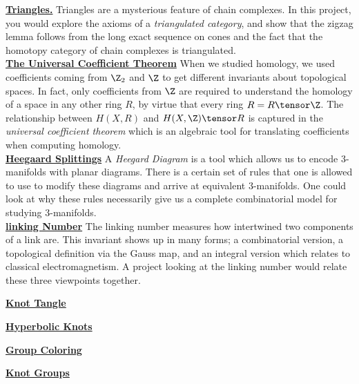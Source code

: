 \noindent \textbf{\hyperref[proj:derived] {Triangles.} } Triangles are a mysterious feature of chain complexes. In this project, you would explore the axioms of a \emph{triangulated category}, and show that the zigzag lemma follows from the long exact sequence on cones and the fact that the homotopy category of chain complexes is triangulated. \\


\noindent \textbf{\hyperref[proj:uct] {The Universal Coefficient Theorem} } When we studied homology, we used coefficients coming from $\Z_2$ and $\Z$ to get different invariants about topological spaces. In fact, only coefficients from $\Z$ are required to understand the homology of a space in any other ring $R$, by virtue that every ring $R=R\tensor \Z$. The relationship between $H(X, R)$ and $H(X, \Z)\tensor R$ is captured in the \emph{universal coefficient theorem} which is an algebraic tool for translating coefficients when computing homology.\\

\noindent \textbf{\hyperref[proj:heegaard]{Heegaard Splittings}} A \emph{Heegard Diagram} is a tool which allows us to encode 3-manifolds with planar diagrams. There is a certain set of rules that one is allowed to use to modify these diagrams and arrive at equivalent 3-manifolds. One could look at why these rules necessarily give us a complete combinatorial model for studying 3-manifolds. \\


\noindent \textbf{\hyperref[proj:linkingnumber]{linking Number}} The linking number measures how intertwined two components of a link are. This invariant shows up in many forms; a combinatorial version, a topological definition via the Gauss map, and an integral version which relates to classical electromagnetism. A project looking at the linking number would relate these three viewpoints together. 


\noindent \textbf{\hyperref[proj:knottangle]{Knot Tangle}}


\noindent \textbf{\hyperref[proj:hyperbolicknot]{Hyperbolic Knots}}


\noindent \textbf{\hyperref[proj:groupcoloring]{Group Coloring}}

\noindent \textbf{\hyperref[proj:knotgroup]{Knot Groups}}





